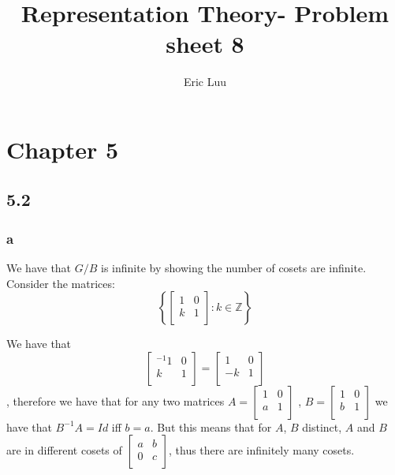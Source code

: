 \documentclass[]{article}
\title{Representation Theory- Problem sheet 8}
\author{Eric Luu}
\begin{document}
\maketitle

\section*{Chapter 5}
\subsection*{5.2}
\subsubsection*{a}
We have that $G/B$ is infinite by showing the number of cosets are infinite. Consider the matrices:
\begin{equation}
	\left\{ \begin{bmatrix}
		1 & 0\\
		k & 1\\
	\end{bmatrix} : k \in \mathbb{Z}\right\}
\end{equation}

We have that 
\begin{equation}
	\begin{bmatrix}^{-1}
		1 & 0\\
		k & 1\\
	\end{bmatrix}
	=
	\begin{bmatrix}
		1 & 0\\
		-k & 1\\
	\end{bmatrix}
\end{equation},
therefore we have that for any two matrices $A = \begin{bmatrix}
	1 & 0\\
	a & 1\\
\end{bmatrix}
$
, $B = 
\begin{bmatrix}
	1 & 0\\
	b & 1\\
\end{bmatrix}
$
we have that $B^{-1} A = Id$ iff $b = a$. But this means that for $A$, $B$ distinct, $A$ and $B$ are in different cosets of $
\begin{bmatrix}
	a & b\\
	0 & c\\
\end{bmatrix}
$, thus there are infinitely many cosets. 
\end{document}
